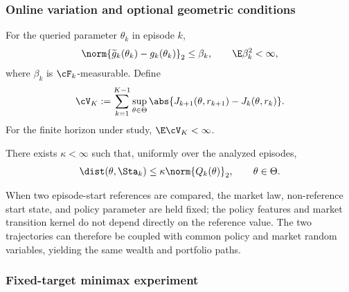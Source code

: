 \subsubsection{Online variation and optional geometric conditions}

\begin{assumption}\label{ass:online-variation}
For the queried parameter $\theta_k$ in episode $k$,
\begin{equation}\label{eq:simulator-gradient-error}
 \norm{\widetilde g_k(\theta_k)-g_k(\theta_k)}_2\le\beta_k,
 \qquad
 \E\beta_k^2<\infty,
\end{equation}
where $\beta_k$ is $\cF_k$-measurable.  Define
\begin{equation}\label{eq:objective-variation}
 \cV_K
 :=\sum_{k=1}^{K-1}
 \sup_{\theta\in\Theta}
 \abs{J_{k+1}(\theta,r_{k+1})-J_k(\theta,r_k)}.
\end{equation}
For the finite horizon under study, $\E\cV_K<\infty$.
\end{assumption}

\begin{assumption}\label{ass:error-bound}
There exists $\kappa<\infty$ such that, uniformly over the analyzed episodes,
\begin{equation}\label{eq:error-bound}
 \dist(\theta,\Sta_k)\le\kappa\norm{Q_k(\theta)}_2,
 \qquad \theta\in\Theta.
\end{equation}
\end{assumption}

\begin{assumption}\label{ass:reference-coupling}
When two episode-start references are compared, the market law, non-reference start state, and policy parameter are held fixed; the policy features and market transition kernel do not depend directly on the reference value.  The two trajectories can therefore be coupled with common policy and market random variables, yielding the same wealth and portfolio paths.
\end{assumption}

\subsubsection{Fixed-target minimax experiment}

